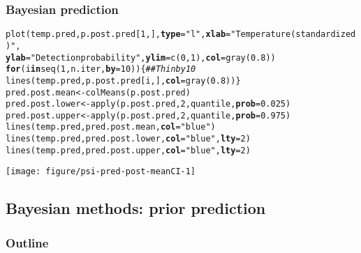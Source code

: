 \documentclass[color=usenames,dvipsnames]{beamer}\usepackage[]{graphicx}\usepackage[]{xcolor}
\makeatletter
\newcommand{\hlnum}[1]{\textcolor[rgb]{0.69,0.494,0}{#1}}%
\newcommand{\hlsng}[1]{\textcolor[rgb]{0.749,0.012,0.012}{#1}}%
\newcommand{\hlcom}[1]{\textcolor[rgb]{0.514,0.506,0.514}{\textit{#1}}}%
\newcommand{\hldef}[1]{\textcolor[rgb]{0,0,0}{#1}}%
\newcommand{\hlkwa}[1]{\textcolor[rgb]{0,0,0}{\textbf{#1}}}%
\newcommand{\hlkwb}[1]{\textcolor[rgb]{0,0.341,0.682}{#1}}%
\newcommand{\hlkwc}[1]{\textcolor[rgb]{0,0,0}{\textbf{#1}}}%
\newcommand{\hlkwd}[1]{\textcolor[rgb]{0.004,0.004,0.506}{#1}}%
\newenvironment{kframe}{%
 \def\at@end@of@kframe{}%
 \ifinner\ifhmode%
  \def\at@end@of@kframe{\end{minipage}}%
  \begin{minipage}{\columnwidth}%
 \fi\fi%
 \def\FrameCommand##1{\hskip\@totalleftmargin \hskip-\fboxsep
 \colorbox{shadecolor}{##1}\hskip-\fboxsep
     \hskip-\linewidth \hskip-\@totalleftmargin \hskip\columnwidth}%
 \MakeFramed {\advance\hsize-\width
   \@totalleftmargin\z@ \linewidth\hsize
   \@setminipage}}%
 {\par\unskip\endMakeFramed%
 \at@end@of@kframe}
\newenvironment{knitrout}{}{} %
\let\hlstd\hldef
\let\hlstr\hlsng
\makeatother
\begin{document}
\begin{frame}[fragile]
  \frametitle{Bayesian prediction}
\begin{knitrout}\tiny
{}\color{fgcolor}\begin{kframe}
\begin{alltt}
\hlkwd{plot}\hlstd{(temp.pred, p.post.pred[}\hlnum{1}\hlstd{,],} \hlkwc{type}\hlstd{=}\hlstr{"l"}\hlstd{,} \hlkwc{xlab}\hlstd{=}\hlstr{"Temperature (standardized)"}\hlstd{,}
     \hlkwc{ylab}\hlstd{=}\hlstr{"Detection probability"}\hlstd{,} \hlkwc{ylim}\hlstd{=}\hlkwd{c}\hlstd{(}\hlnum{0}\hlstd{,} \hlnum{1}\hlstd{),} \hlkwc{col}\hlstd{=}\hlkwd{gray}\hlstd{(}\hlnum{0.8}\hlstd{))}
\hlkwa{for}\hlstd{(i} \hlkwa{in} \hlkwd{seq}\hlstd{(}\hlnum{1}\hlstd{, n.iter,} \hlkwc{by}\hlstd{=}\hlnum{10}\hlstd{)) \{}  \hlcom{## Thin by 10}
    \hlkwd{lines}\hlstd{(temp.pred, p.post.pred[i,],} \hlkwc{col}\hlstd{=}\hlkwd{gray}\hlstd{(}\hlnum{0.8}\hlstd{))  \}}
\hlstd{pred.post.mean} \hlkwb{<-} \hlkwd{colMeans}\hlstd{(p.post.pred)}
\hlstd{pred.post.lower} \hlkwb{<-} \hlkwd{apply}\hlstd{(p.post.pred,} \hlnum{2}\hlstd{, quantile,} \hlkwc{prob}\hlstd{=}\hlnum{0.025}\hlstd{)}
\hlstd{pred.post.upper} \hlkwb{<-} \hlkwd{apply}\hlstd{(p.post.pred,} \hlnum{2}\hlstd{, quantile,} \hlkwc{prob}\hlstd{=}\hlnum{0.975}\hlstd{)}
\hlkwd{lines}\hlstd{(temp.pred, pred.post.mean,} \hlkwc{col}\hlstd{=}\hlstr{"blue"}\hlstd{)}
\hlkwd{lines}\hlstd{(temp.pred, pred.post.lower,} \hlkwc{col}\hlstd{=}\hlstr{"blue"}\hlstd{,} \hlkwc{lty}\hlstd{=}\hlnum{2}\hlstd{)}
\hlkwd{lines}\hlstd{(temp.pred, pred.post.upper,} \hlkwc{col}\hlstd{=}\hlstr{"blue"}\hlstd{,} \hlkwc{lty}\hlstd{=}\hlnum{2}\hlstd{)}
\end{alltt}
\end{kframe}

{\centering \texttt{[image: figure/psi-pred-post-meanCI-1]} 

}


\end{knitrout}
\end{frame}





\subsection{Bayesian methods: prior prediction}



\begin{frame}[plain]
  \frametitle{Outline}
  \Large
\end{frame}
\end{document}
